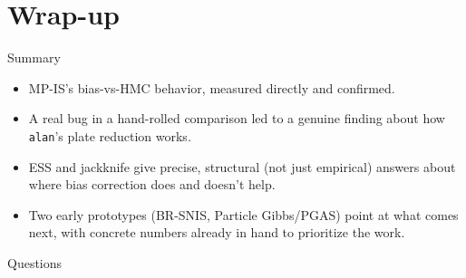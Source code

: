 \documentclass[aspectratio=169]{beamer}
\begin{document}
\section*{Wrap-up}

\begin{frame}{Summary}
  \begin{itemize}
    \item MP-IS's bias-vs-HMC behavior, measured directly and confirmed.
    \item A real bug in a hand-rolled comparison led to a genuine finding
      about how \texttt{alan}'s plate reduction works.
    \item ESS and jackknife give precise, structural (not just empirical)
      answers about where bias correction does and doesn't help.
    \item Two early prototypes (BR-SNIS, Particle Gibbs/PGAS) point at what
      comes next, with concrete numbers already in hand to prioritize the
      work.
  \end{itemize}
\end{frame}

\begin{frame}[standout]
  Questions
\end{frame}
\end{document}
